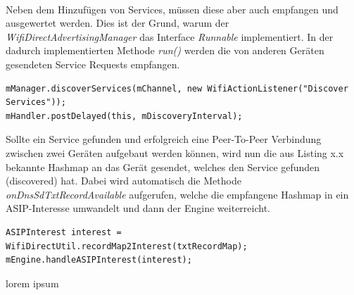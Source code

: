 \\Neben dem Hinzufügen von Services, müssen diese aber auch empfangen und ausgewertet werden. Dies ist der Grund, warum der \textit{WifiDirectAdvertisingManager} das Interface \textit{Runnable} implementiert. In der dadurch implementierten Methode \textit{run()} werden die von anderen Geräten gesendeten Service Requests empfangen.\newline
\lstset{language=Java, caption=Erkennung von Services, label=DescriptiveLabel, numbers=left, numbersep=1em, breaklines=true, basicstyle=\small}
\begin{lstlisting}
mManager.discoverServices(mChannel, new WifiActionListener("Discover Services"));
mHandler.postDelayed(this, mDiscoveryInterval);
\end{lstlisting}
Sollte ein Service gefunden und erfolgreich eine Peer-To-Peer Verbindung zwischen zwei Geräten aufgebaut werden können, wird nun die aus Listing x.x bekannte Hashmap an das Gerät gesendet, welches den Service gefunden (discovered) hat. Dabei wird automatisch die Methode \textit{onDnsSdTxtRecordAvailable} aufgerufen, welche die empfangene Hashmap in ein ASIP-Interesse umwandelt und dann der Engine weiterreicht.\newline
\lstset{language=Java, caption=Vewertung des Interesses, label=DescriptiveLabel, numbers=left, numbersep=1em, breaklines=true, basicstyle=\small}
\begin{lstlisting}
ASIPInterest interest = WifiDirectUtil.recordMap2Interest(txtRecordMap);
mEngine.handleASIPInterest(interest);
\end{lstlisting}  

lorem ipsum


